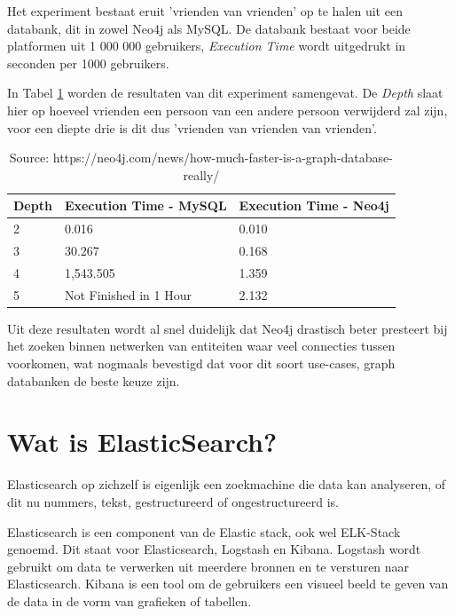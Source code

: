 Het experiment bestaat eruit 'vrienden van vrienden' op te halen uit een databank, dit in zowel Neo4j als MySQL. De databank bestaat voor beide platformen uit 1 000 000 gebruikers, \textit{Execution Time} wordt uitgedrukt in seconden per 1000 gebruikers.

In Tabel \ref{tab:Neo4j - MySql Comparison} worden de resultaten van dit experiment samengevat. De \textit{Depth} slaat hier op hoeveel vrienden een persoon van een andere persoon verwijderd zal zijn, voor een diepte drie is dit dus 'vrienden van vrienden van vrienden'.

	\begin{table}
		\centering
		\begin{tabular}{|l|l|l|}
			\hline
			Depth & Execution Time - MySQL                                & Execution Time - Neo4j \\ \hline
			2     & 0.016                                                 & 0.010                  \\ \hline
			3     &  30.267 & 0.168                  \\ \hline
			4     & 1,543.505                                             & 1.359                  \\ \hline
			5     & Not Finished in 1 Hour                                & 2.132                  \\ \hline
		\end{tabular}
	\caption{\label{tab:Neo4j - MySql Comparison} Source: https://neo4j.com/news/how-much-faster-is-a-graph-database-really/}
	\end{table}


Uit deze resultaten wordt al snel duidelijk dat Neo4j drastisch beter presteert bij het zoeken binnen netwerken van entiteiten waar veel connecties tussen voorkomen, wat nogmaals bevestigd dat voor dit soort use-cases, graph databanken de beste keuze zijn.



\section{Wat is ElasticSearch?}
\label{sec:wat is ElasticSearch?}

Elasticsearch op zichzelf is eigenlijk een zoekmachine die data kan analyseren, of dit nu nummers, tekst, gestructureerd of ongestructureerd is. 

Elasticsearch is een component van de Elastic stack, ook wel ELK-Stack genoemd. Dit staat voor Elasticsearch, Logstash en Kibana. Logstash wordt gebruikt om data te verwerken uit meerdere bronnen en te versturen naar Elasticsearch. Kibana is een tool om de gebruikers een visueel beeld te geven van de data in de vorm van grafieken of tabellen.


